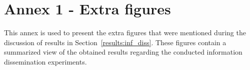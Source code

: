 

\chapter{Annex 1 - Extra figures} \label{annex_1}
\label{ann:lorem_ipsum1}

This annex is used to present the extra figures that were mentioned during the discussion of results in Section~\ref{results:inf_diss}. These figures contain a summarized view of the obtained results regarding the conducted information dissemination experiments.


